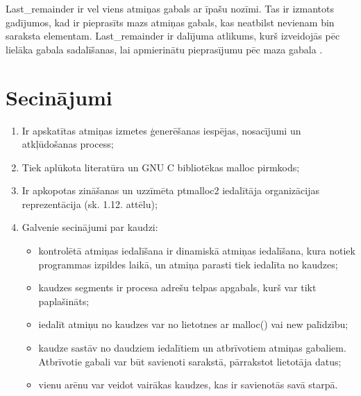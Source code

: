 Last\_remainder ir vel viens atmiņas gabals ar īpašu nozīmi.
Tas ir izmantots gadījumos, kad ir pieprasīts mazs atmiņas gabals, kas neatbilst nevienam bin saraksta elementam. 
Last\_remainder ir dalījuma atlikums, kurš izveidojās pēc lielāka gabala sadalīšanas, lai apmierinātu pieprasījumu pēc maza gabala  \cite {BLACKHAT}.




\section{Secinājumi}
\begin{enumerate}
\item Ir apskatītas atmiņas izmetes ģenerēšanas iespējas, nosacījumi un atkļūdošanas process;
\item Tiek aplūkota literatūra un GNU C bibliotēkas malloc pirmkods;
\item Ir apkopotas zināšanas un uzzīmēta ptmalloc2 iedalītāja organizācijas reprezentācija  (sk. 1.12. attēlu);
\item Galvenie secinājumi par kaudzi:
    \begin{itemize} \itemsep5pt \parskip5pt 
    \item kontrolētā atmiņas iedalīšana ir dinamiskā atmiņas iedalīšana, kura notiek programmas izpildes laikā, un atmiņa parasti tiek iedalīta no kaudzes;
    \item kaudzes segments ir procesa adrešu telpas apgabals, kurš var tikt paplašināts;
    \item iedalīt atmiņu no kaudzes var no lietotnes ar malloc() vai new palīdzību;
    \item kaudze sastāv no daudziem iedalītiem un atbrīvotiem atmiņas gabaliem.
    Atbrīvotie gabali var būt savienoti sarakstā, pārrakstot lietotāja datus;
    \item vienu arēnu var veidot vairākas kaudzes, kas ir savienotās savā starpā.
    \end{itemize}
    
\end{enumerate}